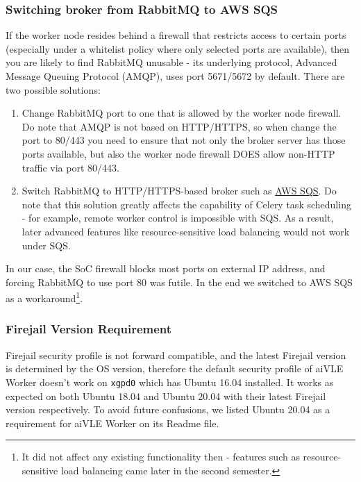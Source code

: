 \documentclass[fyp]{socreport}
\begin{document}
\subsubsection{Switching broker from RabbitMQ to AWS SQS}
If the worker node resides behind a firewall that restricts access to certain ports (especially under a whitelist policy where only selected ports are available), then you are likely to find RabbitMQ unusable - its underlying protocol, Advanced Message Queuing Protocol (AMQP), uses port 5671/5672 by default. There are two possible solutions:
\begin{enumerate}
    \item Change RabbitMQ port to one that is allowed by the worker node firewall. Do note that AMQP is not based on HTTP/HTTPS, so when change the port to 80/443 you need to ensure that not only the broker server has those ports available, but also the worker node firewall DOES allow non-HTTP traffic via port 80/443.
    \item Switch RabbitMQ to HTTP/HTTPS-based broker such as \href{https://aws.amazon.com/sqs/}{AWS SQS}. Do note that this solution greatly affects the capability of Celery task scheduling - for example, remote worker control is impossible with SQS. As a result, later advanced features like resource-sensitive load balancing would not work under SQS.
\end{enumerate}
In our case, the SoC firewall blocks most ports on external IP address, and forcing RabbitMQ to use port 80 was futile. In the end we switched to AWS SQS as a workaround\footnote{It did not affect any existing functionality then - features such as resource-sensitive load balancing came later in the second semester.}.

\subsubsection{Firejail Version Requirement}
Firejail security profile is not forward compatible, and the latest Firejail version is determined by the OS version, therefore the default security profile of aiVLE Worker doesn't work on  \texttt{xgpd0} which has Ubuntu 16.04 installed. It works as expected on both Ubuntu 18.04 and Ubuntu 20.04 with their latest Firejail version respectively.
To avoid future confusions, we listed Ubuntu 20.04 as a requirement for aiVLE Worker on its Readme file.
\end{document}
